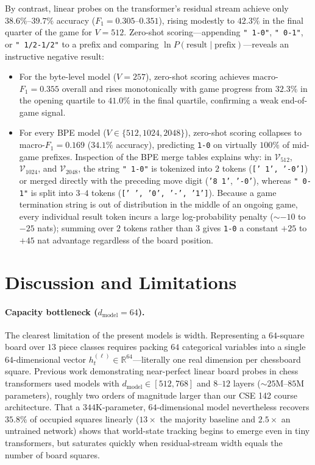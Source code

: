 \documentclass[11pt]{article}
\begin{document}
By contrast, linear probes on the transformer's residual stream achieve only $38.6\%$--$39.7\%$ accuracy ($F_1 = 0.305$--$0.351$), rising modestly to $42.3\%$ in the final quarter of the game for $V=512$. Zero-shot scoring---appending \texttt{" 1-0"}, \texttt{" 0-1"}, or \texttt{" 1/2-1/2"} to a prefix and comparing $\ln P(\text{result} \mid \text{prefix})$---reveals an instructive negative result:
\begin{itemize}
\item For the byte-level model ($V=257$), zero-shot scoring achieves macro-$F_1 = 0.355$ overall and rises monotonically with game progress from $32.3\%$ in the opening quartile to $41.0\%$ in the final quartile, confirming a weak end-of-game signal.
\item For every BPE model ($V \in \{512, 1024, 2048\}$), zero-shot scoring collapses to macro-$F_1 = 0.169$ ($34.1\%$ accuracy), predicting \texttt{1-0} on virtually $100\%$ of mid-game prefixes. Inspection of the BPE merge tables explains why: in $\mathcal{V}_{512}$, $\mathcal{V}_{1024}$, and $\mathcal{V}_{2048}$, the string \texttt{" 1-0"} is tokenized into $2$ tokens (\texttt{[' 1', '-0']}) or merged directly with the preceding move digit (\texttt{'8 1'}, \texttt{'-0'}), whereas \texttt{" 0-1"} is split into $3$--$4$ tokens (\texttt{[' ', '0', '-', '1']}). Because a game termination string is out of distribution in the middle of an ongoing game, every individual result token incurs a large log-probability penalty (${\sim}-10$ to $-25$ nats); summing over $2$ tokens rather than $3$ gives \texttt{1-0} a constant $+25$ to $+45$ nat advantage regardless of the board position.
\end{itemize}

\section{Discussion and Limitations}
\label{sec:discussion}

\paragraph{Capacity bottleneck ($d_{\mathrm{model}}=64$).} The clearest limitation of the present models is width. Representing a $64$-square board over $13$ piece classes requires packing $64$ categorical variables into a single $64$-dimensional vector $h^{(\ell)}_t \in \mathbb{R}^{64}$---literally one real dimension per chessboard square. Previous work demonstrating near-perfect linear board probes in chess transformers \citep{toshniwal2022chess,karvonen2024chess} used models with $d_{\mathrm{model}} \in [512, 768]$ and $8$--$12$ layers (${\sim}25\mathrm{M}$--$85\mathrm{M}$ parameters), roughly two orders of magnitude larger than our CSE 142 course architecture. That a $344\mathrm{K}$-parameter, $64$-dimensional model nevertheless recovers $35.8\%$ of occupied squares linearly ($13\times$ the majority baseline and $2.5\times$ an untrained network) shows that world-state tracking begins to emerge even in tiny transformers, but saturates quickly when residual-stream width equals the number of board squares.
\end{document}
